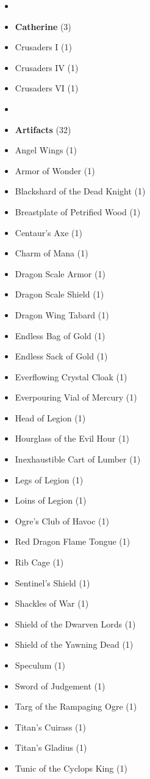 \begin{multicols*}{3}
\begin{itemize}[leftmargin=0pt, label={}, noitemsep, noitemsep]
  \item
  \item \textbf{Catherine} (3)
  \item Crusaders I (1)
  \item Crusaders IV (1)
  \item Crusaders VI (1)
  \item
  \item \textbf{Artifacts} (32)
  \item Angel Wings (1)
  \item Armor of Wonder (1)
  \item Blackshard of the Dead Knight (1)
  \item Breastplate of Petrified Wood (1)
  \item Centaur's Axe (1)
  \item Charm of Mana (1)
  \item Dragon Scale Armor (1)
  \item Dragon Scale Shield (1)
  \item Dragon Wing Tabard (1)
  \item Endless Bag of Gold (1)
  \item Endless Sack of Gold (1)
  \item Everflowing Crystal Cloak (1)
  \item Everpouring Vial of Mercury (1)
  \item Head of Legion (1)
  \item Hourglass of the Evil Hour (1)
  \item Inexhaustible Cart of Lumber (1)
  \item Legs of Legion (1)
  \item Loins of Legion (1)
  \item Ogre's Club of Havoc (1)
  \item Red Dragon Flame Tongue (1)
  \item Rib Cage (1)
  \item Sentinel's Shield (1)
  \item Shackles of War (1)
  \item Shield of the Dwarven Lords (1)
  \item Shield of the Yawning Dead (1)
  \item Speculum (1)
  \item Sword of Judgement (1)
  \item Targ of the Rampaging Ogre (1)
  \item Titan's Cuirass (1)
  \item Titan's Gladius (1)
  \item Tunic of the Cyclops King (1)

\end{itemize}
\end{multicols*}
